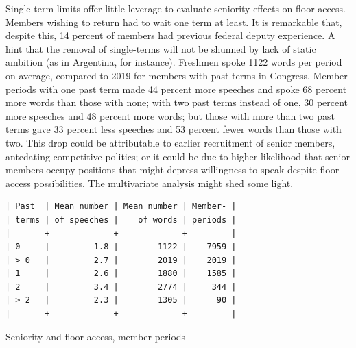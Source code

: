 \documentclass[letter,12pt]{article}
\begin{document}

Single-term limits offer little leverage to evaluate seniority effects on floor access. Members wishing to return had to wait one term at least. It is remarkable that, despite this, 14 percent of members had previous federal deputy experience. A hint that the removal of single-terms will not be shunned by lack of static ambition (as in Argentina, for instance). Freshmen spoke 1122 words per period on average, compared to 2019 for members with past terms in Congress. Member-periods with one past term made 44 percent more speeches and spoke 68 percent more words than those with none; with two past terms instead of one, 30 percent more speeches and 48 percent more words; but those with more than two past terms gave 33 percent less speeches and 53 percent fewer words than those with two. This drop could be attributable to earlier recruitment of senior members, antedating competitive politics; or it could be due to higher likelihood that senior members occupy positions that might depress willingness to speak despite floor access possibilities. The multivariate analysis might shed some light.  

\begin{table}
  \begin{scriptsize}
    \begin{verbatim}
| Past  | Mean number | Mean number | Member- |
| terms | of speeches |    of words | periods |
|-------+-------------+-------------+---------|
| 0     |         1.8 |        1122 |    7959 |
| > 0   |         2.7 |        2019 |    2019 |
| 1     |         2.6 |        1880 |    1585 |
| 2     |         3.4 |        2774 |     344 |
| > 2   |         2.3 |        1305 |      90 |
|-------+-------------+-------------+---------|
    \end{verbatim}
  \end{scriptsize}
\caption{Seniority and floor access, member-periods}
\end{table}
  
\end{document}
